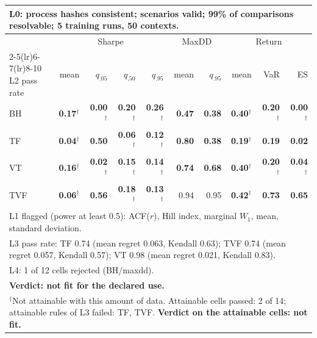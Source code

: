 \begin{tabular}{lrrrrrrrrr}
\toprule
\multicolumn{10}{p{13.5cm}}{L0: process hashes consistent; scenarios valid; 99\% of comparisons resolvable; 5 training runs, 50 contexts.} \\
\midrule
 & \multicolumn{4}{c}{Sharpe} & \multicolumn{2}{c}{MaxDD} & \multicolumn{3}{c}{Return} \\
\cmidrule(lr){2-5}\cmidrule(lr){6-7}\cmidrule(lr){8-10}
L2 pass rate & mean & $q_{.05}$ & $q_{.50}$ & $q_{.95}$ & mean & $q_{.95}$ & mean & VaR & ES \\
\midrule
BH & \textbf{0.17}$^{\dagger}$ & \textbf{0.00}$^{\dagger}$ & \textbf{0.20}$^{\dagger}$ & \textbf{0.26}$^{\dagger}$ & \textbf{0.47} & \textbf{0.38} & \textbf{0.40}$^{\dagger}$ & \textbf{0.20}$^{\dagger}$ & \textbf{0.00}$^{\dagger}$ \\
TF & \textbf{0.04}$^{\dagger}$ & \textbf{0.50} & \textbf{0.06}$^{\dagger}$ & \textbf{0.12}$^{\dagger}$ & \textbf{0.80} & \textbf{0.38} & \textbf{0.19}$^{\dagger}$ & \textbf{0.19} & \textbf{0.02} \\
VT & \textbf{0.16}$^{\dagger}$ & \textbf{0.02}$^{\dagger}$ & \textbf{0.15}$^{\dagger}$ & \textbf{0.14}$^{\dagger}$ & \textbf{0.74} & \textbf{0.68} & \textbf{0.40}$^{\dagger}$ & \textbf{0.20}$^{\dagger}$ & \textbf{0.04}$^{\dagger}$ \\
TVF & \textbf{0.06}$^{\dagger}$ & \textbf{0.56} & \textbf{0.18}$^{\dagger}$ & \textbf{0.13}$^{\dagger}$ & 0.94 & 0.95 & \textbf{0.42}$^{\dagger}$ & \textbf{0.73} & \textbf{0.65} \\
\midrule
\multicolumn{10}{p{13.5cm}}{L1 flagged (power at least 0.5): ACF($r$), Hill index, marginal $W_1$, mean, standard deviation.} \\
\multicolumn{10}{p{13.5cm}}{L3 pass rate: TF 0.74 (mean regret 0.063, Kendall 0.63); TVF 0.74 (mean regret 0.057, Kendall 0.57); VT 0.98 (mean regret 0.021, Kendall 0.83).} \\
\multicolumn{10}{p{13.5cm}}{L4: 1 of 12 cells rejected (BH/maxdd).} \\
\multicolumn{10}{p{13.5cm}}{\textbf{Verdict: not fit for the declared use.}} \\
\multicolumn{10}{p{13.5cm}}{$^{\dagger}$Not attainable with this amount of data. Attainable cells passed: 2 of 14; attainable rules of L3 failed: TF, TVF. \textbf{Verdict on the attainable cells: not fit.}} \\
\bottomrule
\end{tabular}

